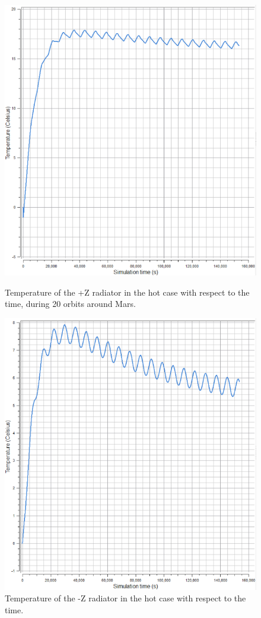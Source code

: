 \documentclass[a4paper, oneside, 11pt]{article}
\begin{document}
\begin{figure}[!ht] 
\begin{minipage}{8cm}
\centering
\includegraphics[scale=0.37]{PZhot}
\centering
\caption{Temperature of the +Z radiator in the hot case with respect to the time, during 20 orbits around Mars.}
\label{tempPZHOT}
\end{minipage} 
\medskip
\begin{minipage}{8cm}
\centering
\includegraphics[scale=0.38]{NZhot}
\caption{Temperature of the -Z radiator in the hot case with respect to the time.}
\label{tempNZhot}
\end{minipage} 
\end{figure}
\end{document}
